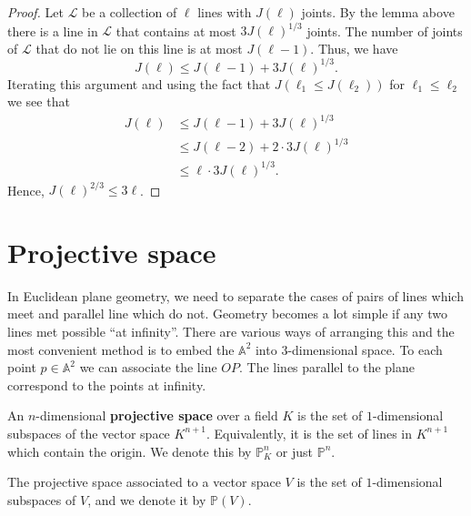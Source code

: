 \documentclass[12pt, a4paper]{article}
\renewcommand{\AA}{\mathbb A}
\newcommand{\PP}{\mathbb P}
\begin{document}
\begin{proof}
    Let \(\mathcal{L}\) be a collection of \(\ell\) lines with \(J(\ell)\) joints. By the lemma above there is a line in \(\mathcal{L}\) that contains at most \(3J(\ell)^{1/3}\) joints. The number of joints of \(\mathcal{L}\) that do not lie on this line is at most \(J(\ell-1)\). Thus, we have
    \[J(\ell) \leq J(\ell-1)+3J(\ell)^{1/3}.\]
    Iterating this argument and using the fact that \(J(\ell_1\leq J(\ell_2))\) for \(\ell_1 \leq \ell_2\) we see that 
    \[\begin{aligned}
        J(\ell) &\leq J(\ell-1)+3J(\ell)^{1/3} \\
                &\leq J(\ell-2)+2\cdot 3J(\ell)^{1/3}\\
                &\leq \ell \cdot 3J(\ell)^{1/3}.
    \end{aligned}\]
    Hence, \(J(\ell)^{2/3}\leq 3\ell\).
\end{proof}

\section{Projective space}

\begin{mdnote}
    In Euclidean plane geometry, we need to separate the cases of pairs of lines which meet and parallel line which do not. Geometry becomes a lot simple if any two lines met possible ``at infinity''. There are various ways of arranging this and the most convenient method is to embed the \(\AA^2\) into \(3\)-dimensional space. To each point \(p \in \AA^2\) we can associate the line \(OP\). The lines parallel to the plane correspond to the points at infinity.
\end{mdnote}

\begin{definition}
    An \(n\)-dimensional \textbf{projective space} over a field \(K\) is the set of \(1\)-dimensional subspaces of the vector space \(K^{n+1}\). Equivalently, it is the set of lines in \(K^{n+1}\) which contain the origin. We denote this by \(\PP^n_K\) or just \(\PP^n\).
\end{definition}

\begin{proposition}
    The projective space associated to a vector space \(V\) is the set of \(1\)-dimensional subspaces of \(V\), and we denote it by \(\PP(V)\).
\end{proposition}
\end{document}
